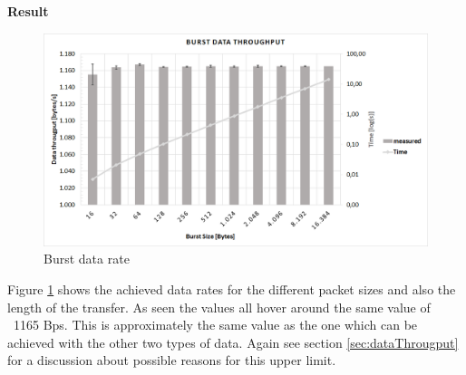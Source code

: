\begin{description}
	\item{\textbf{Result}} \hfill \\ 
	\begin{figure}[H]
		\centering
		\includegraphics[scale=0.5]{content/images/exp5.png}
		\caption{Burst data rate}\label{fig:exp5}
	\end{figure}
	Figure \ref{fig:exp5} shows the achieved data rates for the different packet sizes and also the length of the transfer. As seen the values all hover around the same value of ~1165 Bps. This is approximately the same value as the one which can be achieved with the other two types of data.
	Again see section \ref{sec:dataThrougput} for a discussion about possible reasons for this upper limit. 
\end{description}
\newpage


